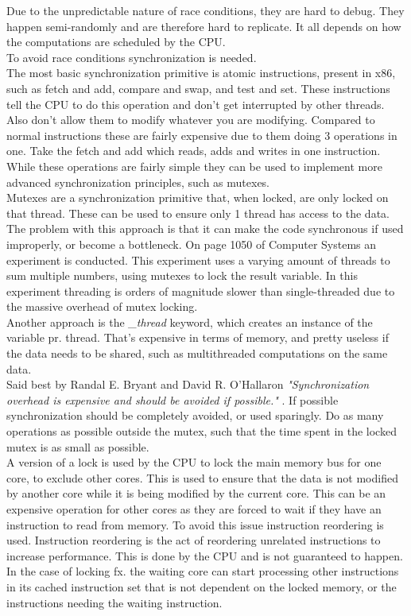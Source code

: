 \documentclass[11pt]{report}
\begin{document}
Due to the unpredictable nature of race conditions, they are hard to debug. They happen semi-randomly and are therefore hard to replicate. It all depends on how the computations are scheduled by the CPU.\\[1ex]

To avoid race conditions synchronization is needed.\\
The most basic synchronization primitive is atomic instructions, present in x86, such as fetch and add, compare and swap, and test and set. These instructions tell the CPU to do this operation and don't get interrupted by other threads. Also don't allow them to modify whatever you are modifying. Compared to normal instructions these are fairly expensive due to them doing 3 operations in one. Take the fetch and add which reads, adds and writes in one instruction. While these operations are fairly simple they can be used to implement more advanced synchronization principles, such as mutexes.\\[1ex]

Mutexes are a synchronization primitive that, when locked, are only locked on that thread. These can be used to ensure only 1 thread has access to the data. The problem with this approach is that it can make the code synchronous if used improperly, or become a bottleneck. On page 1050 of Computer Systems \cite{computer-systems} an experiment is conducted. This experiment uses a varying amount of threads to sum multiple numbers, using mutexes to lock the result variable. In this experiment threading is orders of magnitude slower than single-threaded due to the massive overhead of mutex locking.\\[1ex]

Another approach is the \textit{\_thread} keyword, which creates an instance of the variable pr. thread. That's expensive in terms of memory, and pretty useless if the data needs to be shared, such as multithreaded computations on the same data.\\[1ex]

Said best by Randal E. Bryant and David R. O'Hallaron \textit{"Synchronization overhead is expensive and should be avoided if possible."} \cite{computer-systems}. If possible synchronization should be completely avoided, or used sparingly. Do as many operations as possible outside the mutex, such that the time spent in the locked mutex is as small as possible.\\[1ex]

A version of a lock is used by the CPU to lock the main memory bus for one core, to exclude other cores. This is used to ensure that the data is not modified by another core while it is being modified by the current core. This can be an expensive operation for other cores as they are forced to wait if they have an instruction to read from memory. To avoid this issue instruction reordering is used. Instruction reordering is the act of reordering unrelated instructions to increase performance. This is done by the CPU and is not guaranteed to happen. In the case of locking fx. the waiting core can start processing other instructions in its cached instruction set that is not dependent on the locked memory, or the instructions needing the waiting instruction.\\[1ex]
\end{document}

